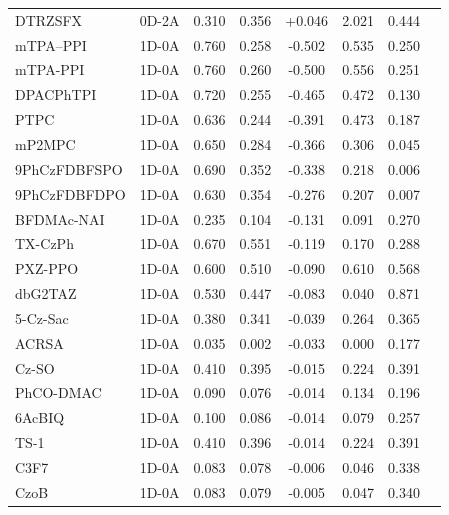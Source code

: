 \begin{longtable}{llcccccc}
DTRZSFX & 0D-2A & 0.310 & 0.356 & +0.046 & 2.021 & 0.444 & \cite{doi101016jdyepig2020108894} \\
mTPA--PPI & 1D-0A & 0.760 & 0.258 & -0.502 & 0.535 & 0.250 & \cite{doi101039C5SC01131K} \\
mTPA-PPI & 1D-0A & 0.760 & 0.260 & -0.500 & 0.556 & 0.251 & \cite{doi101039C5SC01131K} \\
DPACPhTPI & 1D-0A & 0.720 & 0.255 & -0.465 & 0.472 & 0.130 & \cite{doi101016jdyepig201701028} \\
PTPC & 1D-0A & 0.636 & 0.244 & -0.391 & 0.473 & 0.187 & \cite{doi101039D2QM00506A} \\
mP2MPC & 1D-0A & 0.650 & 0.284 & -0.366 & 0.306 & 0.045 & \cite{doi101016jcej2022138339} \\
9PhCzFDBFSPO & 1D-0A & 0.690 & 0.352 & -0.338 & 0.218 & 0.006 & \cite{doi101016jcej2019122485} \\
9PhCzFDBFDPO & 1D-0A & 0.630 & 0.354 & -0.276 & 0.207 & 0.007 & \cite{doi101016jcej2019122485} \\
BFDMAc-NAI & 1D-0A & 0.235 & 0.104 & -0.131 & 0.091 & 0.270 & \cite{doi101039C9TC01973A} \\
TX-CzPh & 1D-0A & 0.670 & 0.551 & -0.119 & 0.170 & 0.288 & \cite{doi101039D1TC02324A} \\
PXZ-PPO & 1D-0A & 0.600 & 0.510 & -0.090 & 0.610 & 0.568 & \cite{doi101039D0TC03747H} \\
dbG2TAZ & 1D-0A & 0.530 & 0.447 & -0.083 & 0.040 & 0.871 & \cite{doi101039C6CC09275F} \\
5-Cz-Sac & 1D-0A & 0.380 & 0.341 & -0.039 & 0.264 & 0.365 & \cite{doi101016jcej2021129628} \\
ACRSA & 1D-0A & 0.035 & 0.002 & -0.033 & 0.000 & 0.177 & \cite{doi101039C3CC44179B} \\
Cz-SO & 1D-0A & 0.410 & 0.395 & -0.015 & 0.224 & 0.391 & \cite{doi101016jtet2020131869} \\
PhCO-DMAC & 1D-0A & 0.090 & 0.076 & -0.014 & 0.134 & 0.196 & \cite{doi101016jcej2020127418} \\
6AcBIQ & 1D-0A & 0.100 & 0.086 & -0.014 & 0.079 & 0.257 & \cite{doi101016jdyepig201705036} \\
TS-1 & 1D-0A & 0.410 & 0.396 & -0.014 & 0.224 & 0.391 & \cite{doi101016jtet2020131869} \\
C3F7 & 1D-0A & 0.083 & 0.078 & -0.006 & 0.046 & 0.338 & \cite{doi101016jdyepig201905002} \\
CzoB & 1D-0A & 0.083 & 0.079 & -0.005 & 0.047 & 0.340 & \cite{doi101016jdyepig201905002} \\

\end{longtable}
